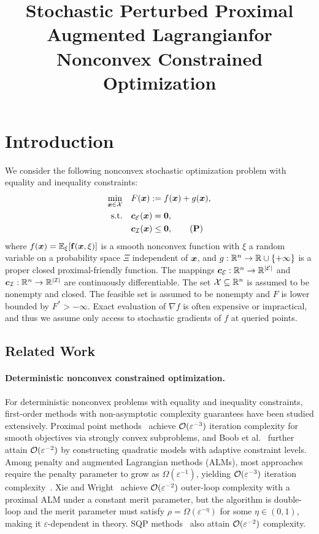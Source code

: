 \documentclass[10pt]{article}
\title{Stochastic Perturbed Proximal Augmented Lagrangianfor Nonconvex Constrained Optimization}
\newcommand{\calE}{\mathcal{E}}
\newcommand{\calI}{\mathcal{I}}
\begin{document}
\maketitle

\section{Introduction}
\label{sec:intro}
We consider the following nonconvex stochastic optimization problem with 
equality and inequality constraints:
\begin{align}\label{Prob: primal problem}
    \min_{\bx \in \calX} \quad & F(\bx) := f(\bx) + g(\bx), \notag \\
    \text{s.t.} \quad & \bc_{\calE}(\bx) = \bm{0}, \notag\\
    & \bc_{\calI}(\bx) \le \bm{0}, \tag{{\bf P}}
\end{align}
where $f(\bm{x}) = \mathbb{E}_{\xi}[\mathbf{f}(\bm{x},\xi)]$ is a smooth nonconvex 
function with $\xi$ a random variable on a probability space $\Xi$ independent 
of $\bm{x}$, and $g:\mathbb{R}^n\to\mathbb{R}\cup\{+\infty\}$ is a proper closed 
proximal-friendly function. The mappings $\bc_{\calE}:\RR^n\to\RR^{|\calE|}$ and
$\bc_{\calI}:\RR^n\to\RR^{|\calI|}$ are continuously differentiable. The set
$\mathcal{X}\subseteq\mathbb{R}^n$ is assumed to be nonempty and closed.
The feasible set is assumed to be nonempty and $F$ is lower 
bounded by $F^*>-\infty$. Exact evaluation of $\nabla f$ is often expensive or 
impractical, and thus we assume only access to stochastic gradients of $f$ at 
queried points.


\subsection{Related Work}
\label{sec:related-work}

\paragraph{Deterministic nonconvex constrained optimization.}
For deterministic nonconvex problems with equality and inequality constraints,
first-order methods with non-asymptotic complexity guarantees have been studied
extensively.
Proximal point methods~\cite{boob2023stochastic,ma2022quadratically} achieve
$\mathcal{O}(\varepsilon^{-3})$ iteration complexity for smooth objectives via strongly
convex subproblems, and Boob et al.~\cite{boob2022level} further attain
$\mathcal{O}(\varepsilon^{-2})$ by constructing quadratic models with adaptive
constraint levels.
Among penalty and augmented Lagrangian methods (ALMs), most approaches
require the penalty parameter to grow as $\Omega(\varepsilon^{-1})$, yielding
$\mathcal{O}(\varepsilon^{-3})$ iteration complexity~\cite{li2021rate,jia2023first}.
Xie and Wright~\cite{xie2021proximal} achieve $\mathcal{O}(\varepsilon^{-2})$
outer-loop complexity with a proximal ALM under a constant merit parameter,
but the algorithm is double-loop and the merit parameter must satisfy
$\rho = \Omega(\varepsilon^{-\eta})$ for some $\eta \in (0,1)$, making it
$\varepsilon$-dependent in theory.
SQP methods~\cite{curtis2021sqp,cartis2014complexity} also attain
$\mathcal{O}(\varepsilon^{-2})$ complexity.
\end{document}
